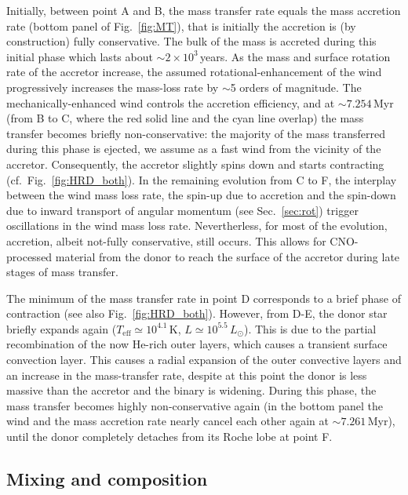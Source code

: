 \documentclass[twocolumn,twocolappendix,trackchanges]{aastex63}
\DeclareRobustCommand{\Figref}[1]{Fig.~\ref{#1}}
\DeclareRobustCommand{\Secref}[1]{Sec.~\ref{#1}}
\begin{document}
Initially, between point A and B, the mass transfer rate equals the mass accretion rate
(bottom panel of \Figref{fig:MT}), that is initially the accretion is
(by construction) fully conservative. The bulk of the mass is accreted
during this initial phase which lasts about $\sim{}2\times10^3$\,years. As the mass and surface rotation
rate of the accretor increase, the assumed rotational-enhancement of
the wind progressively increases the mass-loss rate by $\sim$5 orders
of magnitude. The mechanically-enhanced wind
controls the accretion efficiency, and at
$\sim$$7.254$\,Myr (from B to C, where the red solid line and the cyan line overlap) the mass transfer becomes briefly non-conservative: the majority of the mass transferred during this phase is ejected, we assume as a fast wind from the vicinity of the accretor. Consequently, the accretor slightly spins down and starts contracting (cf.~\Figref{fig:HRD_both}).
In the remaining evolution from C to F, the interplay between the wind mass loss rate, the spin-up due to accretion and the spin-down due to inward transport of angular momentum (see \Secref{sec:rot}) trigger oscillations in the wind mass loss rate. Nevertherless, for most of the evolution, accretion, albeit not-fully conservative, still occurs. This allows for CNO-processed material from the donor to reach the surface of the accretor during late stages of mass transfer.

The minimum of the mass transfer rate in point D corresponds to a brief phase of contraction (see also \Figref{fig:HRD_both}). However, from D-E, the donor star briefly expands again
($T_\mathrm{eff}\simeq10^{4.1}$\,K, $L\simeq10^{5.5}\,L_\odot$). This
is due to the partial recombination of the now He-rich outer layers,
which causes a transient surface convection layer. This causes a
radial expansion of the outer convective layers and an increase in the
mass-transfer rate, despite at this point the donor is less massive
than the accretor and the binary is widening.  During this phase, the
mass transfer becomes highly non-conservative again (in the bottom
panel the wind and the mass accretion rate nearly cancel each other again
at $\sim7.261$\,Myr), until the donor completely detaches from its Roche lobe at point F.

\subsection{Mixing and composition}
\label{sec:mixing}
\end{document}
